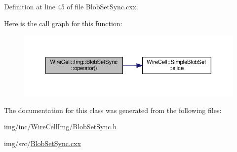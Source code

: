 Definition at line 45 of file Blob\+Set\+Sync.\+cxx.

Here is the call graph for this function\+:
\nopagebreak
\begin{figure}[H]
\begin{center}
\leavevmode
\includegraphics[width=350pt]{class_wire_cell_1_1_img_1_1_blob_set_sync_a536fca2a18e1bf4b44e5aad6f8b39ded_cgraph}
\end{center}
\end{figure}


The documentation for this class was generated from the following files\+:\begin{DoxyCompactItemize}
\item 
img/inc/\+Wire\+Cell\+Img/\hyperlink{_blob_set_sync_8h}{Blob\+Set\+Sync.\+h}\item 
img/src/\hyperlink{_blob_set_sync_8cxx}{Blob\+Set\+Sync.\+cxx}\end{DoxyCompactItemize}
